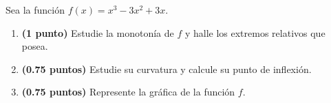 
Sea la función $f(x)=x^3-3x^2+3x$.
\begin{enumerate}[label=\alph*)]
\item \textbf{(1 punto)} Estudie la monotonía de $f$ y halle los extremos relativos que posea.
\item \textbf{(0.75 puntos)} Estudie su curvatura y calcule su punto de inflexión.
\item \textbf{(0.75 puntos)} Represente la gráfica de la función $f$.
\end{enumerate}

